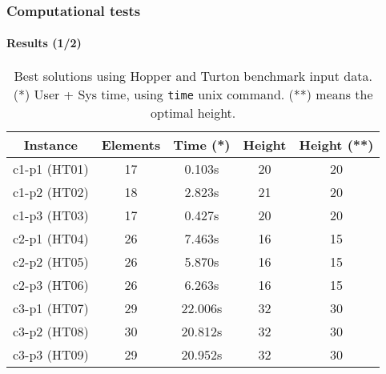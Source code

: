 \begin{frame}
    \frametitle{Computational tests}
    \framesubtitle{Results (1/2)}

    \begin{table}[H]
        \centering
        \small
        \begin{tabular}{|c|c|c|c|c|}
            \hline
            \textbf{Instance} & \textbf{Elements} & \textbf{Time (*)} & \textbf{Height} & \textbf{Height (**)} \\ \hline
            c1-p1 (HT01)      & 17                & 0.103s        & 20              & 20                  \\ \hline
            c1-p2 (HT02)      & 18                & 2.823s        & 21              & 20                  \\ \hline
            c1-p3 (HT03)      & 17                & 0.427s        & 20              & 20                  \\ \hline
            c2-p1 (HT04)      & 26                & 7.463s        & 16              & 15                  \\ \hline
            c2-p2 (HT05)      & 26                & 5.870s        & 16              & 15                  \\ \hline
            c2-p3 (HT06)      & 26                & 6.263s        & 16              & 15                  \\ \hline
            c3-p1 (HT07)      & 29                & 22.006s       & 32              & 30                  \\ \hline
            c3-p2 (HT08)      & 30                & 20.812s       & 32              & 30                  \\ \hline
            c3-p3 (HT09)      & 29                & 20.952s       & 32              & 30                  \\ \hline
        \end{tabular}
        \label{tab:results}
        \caption{Best solutions using Hopper and Turton benchmark input 
    data. (*) User + Sys time, using \texttt{time} unix command. (**) means the optimal height.}
    \end{table}
\end{frame}

